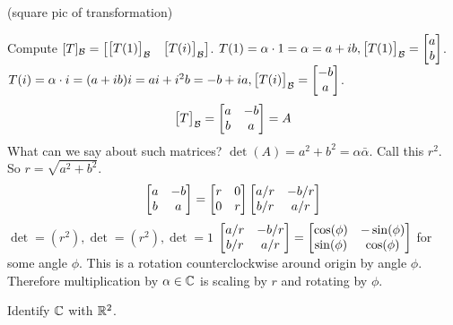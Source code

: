 \documentclass[10pt,a4paper]{article}
\begin{document}
(square pic of transformation)

Compute $[T]_{\mathcal{B}} = \begin{bmatrix}\begin{bmatrix}T(1)\end{bmatrix}_{\mathcal{B}} & \begin{bmatrix}T(i)\end{bmatrix}_{\mathcal{B}}\end{bmatrix}$.
$T(1) = \alpha \cdot 1 = \alpha = a + ib, \begin{bmatrix}T(1)\end{bmatrix}_{\mathcal{B}} = \begin{bmatrix}a \\ b\end{bmatrix}$.
$T(i) = \alpha \cdot i = (a + ib)i = ai + i^2 b = -b + ia, \begin{bmatrix}T(i)\end{bmatrix}_{\mathcal{B}} = \begin{bmatrix}-b\\a\end{bmatrix}$.
$$\begin{bmatrix}T\end{bmatrix}_{\mathcal{B}} = \begin{bmatrix}a & -b \\ b & a\end{bmatrix} = A$$ What can we say about such matrices?
$\det(A) = a^2 + b^2 = \alpha \bar \alpha$. Call this $r^2$. So $r = \sqrt{a^2 + b^2}$.
$$\begin{bmatrix}a & -b \\ b & a\end{bmatrix} = \begin{bmatrix}r & 0 \\ 0 & r\end{bmatrix} \begin{bmatrix}a/r & -b/r \\ b/r & a/r\end{bmatrix}$$
$\det= (r^2), \det = (r^2), \det = 1$
$\begin{bmatrix}a/r & -b/r \\ b/r & a/r\end{bmatrix} = \begin{bmatrix}\cos(\phi) & -\sin(\phi) \\ \sin(\phi) & \cos(\phi)\end{bmatrix}$ for some angle $\phi$. This is a rotation counterclockwise around origin by angle $\phi$.
Therefore multiplication by $\alpha\in \mathbb{C}$ is scaling by $r$ and rotating by $\phi$.
\begin{remark}
	Identify $\mathbb{C}$ with $\mathbb{R}^2$.
\end{remark}
\end{document}
